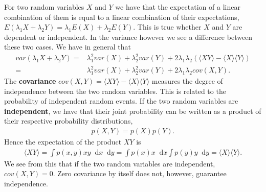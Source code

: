 \documentclass[twoside,english]{uiofysmaster}
\newcommand*\dif{\mathop{}\!\mathrm{d}}
\begin{document}
For two random variables $X$ and $Y$ we have that the expectation of a
linear combination of them is equal to a linear combination of their
expectations, $E(\lambda_1 X + \lambda_2 Y) = \lambda_1 E(X) +
\lambda_2 E(Y)$. This is true whether $X$ and $Y$ are dependent or
independent. In the variance however we see a difference between these
two cases. We have in general that
\begin{align}
	var(\lambda_1 X + \lambda_2 Y) =& \lambda_1^2 var(X) + \lambda_2^2 var(Y) + 2 \lambda_1 \lambda_2 ( \langle XY \rangle
	- \langle X \rangle \langle Y \rangle) \\
	=& \lambda_1^2 var(X) + \lambda_2^2 var(Y) + 2 \lambda_1 \lambda_2 cov (X, Y).
\end{align}
The \textbf{covariance} $cov(X, Y) = \langle XY \rangle - \langle X
\rangle \langle Y \rangle$ measures the degree of independence between
the two random variables. This is related to the probability of
independent random events. If the two random variables are
\textbf{independent}, we have that their joint probability can be
written as a product of their respective probability distributions,
\begin{align}
	p(X, Y) = p(X) p(Y) .
\end{align}
Hence the expectation of the product $XY$ is
\begin{align}
	\langle XY \rangle = \int p(x, y) xy \dif x \dif y = \int p(x) x \dif x \int p(y) y \dif y
	=\langle X \rangle \langle Y \rangle.
\end{align}
We see from this that if the two random variables are independent,
$cov(X,Y) = 0$. Zero covariance by itself does not, however, guarantee
independence.

\begin{comment}
From the covariance we may derive the \textbf{correlation coefficient}
\begin{align}
	\rho(X,Y) =& \frac{cov(X,Y)}{\sqrt{ \langle X \rangle \langle Y \rangle }}, \quad
	-1 \geq \rho(X,Y) \leq 1.
\end{align}

Given the \textbf{bivariate probability distribution function}
$p(X,Y)$ of two random variables, the \textbf{marginal probability
  distribution function} can be found for either of the them by
\begin{align}
	p(X) = \int p(X,y) \dif y.
\end{align}
The \textbf{conditional probability} is then given
\begin{align}
	p(Y|X) = \frac{p(X,Y)}{p(X)}.
\end{align}
This can be generalized to multivariate distributions of more than two random variables.
\end{comment}
\end{document}
